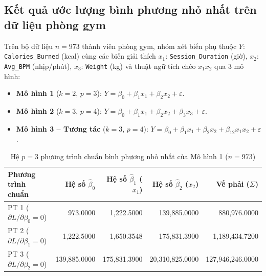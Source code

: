 \documentclass[12pt,a4paper]{report}
\begin{document}
\subsection{Kết quả ước lượng bình phương nhỏ nhất trên dữ liệu phòng gym}
Trên bộ dữ liệu $n = 973$ thành viên phòng gym, nhóm xét biến phụ thuộc $Y$: \texttt{Calories\_Burned} (kcal) cùng các biến giải thích $x_1$: \texttt{Session\_Duration} (giờ), $x_2$: \texttt{Avg\_BPM} (nhịp/phút), $x_3$: \texttt{Weight} (kg) và thuật ngữ tích chéo $x_1 x_2$ qua 3 mô hình:
\begin{itemize}
    \item \textbf{Mô hình 1} ($k = 2$, $p = 3$): $Y = \beta_0 + \beta_1 x_1 + \beta_2 x_2 + \varepsilon$.
    \item \textbf{Mô hình 2} ($k = 3$, $p = 4$): $Y = \beta_0 + \beta_1 x_1 + \beta_2 x_2 + \beta_3 x_3 + \varepsilon$.
    \item \textbf{Mô hình 3 -- Tương tác} ($k = 3$, $p = 4$): $Y = \beta_0 + \beta_1 x_1 + \beta_2 x_2 + \beta_{12} x_1 x_2 + \varepsilon$.
\end{itemize}

\begin{table}[htbp]
\centering\small
\caption{Hệ $p = 3$ phương trình chuẩn bình phương nhỏ nhất của Mô hình 1 ($n = 973$)}
\begin{tabular}{lrrrr}
\toprule
\textbf{Phương trình chuẩn} & \textbf{Hệ số $\hat{\beta}_0$} & \textbf{Hệ số $\hat{\beta}_1$ ($x_1$)} & \textbf{Hệ số $\hat{\beta}_2$ ($x_2$)} & \textbf{Vế phải ($\Sigma$)} \\
\midrule
PT 1 ($\partial L / \partial \beta_0 = 0$) & 973.0000 & 1,222.5000 & 139,885.0000 & 880,976.0000 \\
PT 2 ($\partial L / \partial \beta_1 = 0$) & 1,222.5000 & 1,650.3548 & 175,831.3900 & 1,189,434.7200 \\
PT 3 ($\partial L / \partial \beta_2 = 0$) & 139,885.0000 & 175,831.3900 & 20,310,825.0000 & 127,946,246.0000 \\
\bottomrule
\end{tabular}
\end{table}
\end{document}
